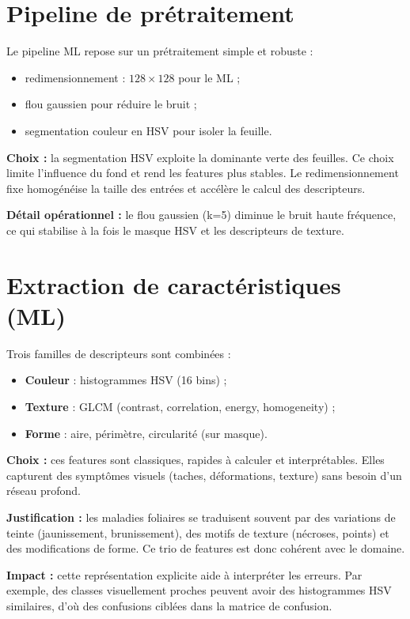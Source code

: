 \documentclass[12pt,a4paper]{article}
\begin{document}
\section{Pipeline de pr\'etraitement}
Le pipeline ML repose sur un pr\'etraitement simple et robuste :
\begin{itemize}[leftmargin=*]
    \item redimensionnement : $128\times128$ pour le ML ;
    \item flou gaussien pour r\'eduire le bruit ;
    \item segmentation couleur en HSV pour isoler la feuille.
\end{itemize}

\textbf{Choix :} la segmentation HSV exploite la dominante verte des feuilles. Ce choix limite l'influence du fond et rend les features plus stables. Le redimensionnement fixe homog\'en\'eise la taille des entr\'ees et acc\'el\`ere le calcul des descripteurs.

\textbf{D\'etail op\'erationnel :} le flou gaussien (k=5) diminue le bruit haute fr\'equence, ce qui stabilise \`a la fois le masque HSV et les descripteurs de texture.

\section{Extraction de caract\'eristiques (ML)}
Trois familles de descripteurs sont combin\'ees :
\begin{itemize}[leftmargin=*]
    \item \textbf{Couleur} : histogrammes HSV (16 bins) ;
    \item \textbf{Texture} : GLCM (contrast, correlation, energy, homogeneity) ;
    \item \textbf{Forme} : aire, p\'erim\`etre, circularit\'e (sur masque).
\end{itemize}

\textbf{Choix :} ces features sont classiques, rapides \`a calculer et interpr\'etables. Elles capturent des sympt\^omes visuels (taches, d\'eformations, texture) sans besoin d'un r\'eseau profond.

\textbf{Justification :} les maladies foliaires se traduisent souvent par des variations de teinte (jaunissement, brunissement), des motifs de texture (n\'ecroses, points) et des modifications de forme. Ce trio de features est donc coh\'erent avec le domaine.

\textbf{Impact :} cette repr\'esentation explicite aide \`a interpr\'eter les erreurs. Par exemple, des classes visuellement proches peuvent avoir des histogrammes HSV similaires, d'o\`u des confusions cibl\'ees dans la matrice de confusion.
\end{document}
